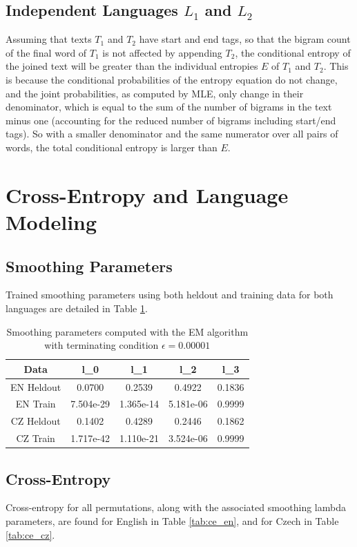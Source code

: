 \documentclass[a4paper]{article}
\begin{document}
\subsection{Independent Languages $L_1$ and $L_2$}
Assuming that texts $T_1$ and $T_2$ have start and end tags, so that the bigram
count of the final word of $T_1$ is not affected by appending $T_2$, the
conditional entropy of the joined text will be greater than the individual
entropies $E$ of $T_1$ and $T_2$. This is because the conditional probabilities
of the entropy equation do not change, and the joint probabilities, as computed
by MLE, only change in their denominator, which is equal to the sum of the
number of bigrams in the text minus one (accounting for the reduced number of
bigrams including start/end tags). So with a smaller denominator and the same
numerator over all pairs of words, the total conditional entropy is larger than
$E$.

\section{Cross-Entropy and Language Modeling}
\label{sec:lm}

\subsection{Smoothing Parameters}
Trained smoothing parameters using both heldout and training data for both
languages are detailed in Table \ref{tab:smoothing}.

\begin{table}[h]
	\centering
	\caption{Smoothing parameters computed with the EM algorithm with
		terminating condition $\epsilon=0.00001$}
	\label{tab:smoothing}
	\begin{tabular}{c|cccc}
		Data & l\_0 & l\_1 & l\_2 & l\_3 \\
		\hline
		EN Heldout & 0.0700 & 0.2539 & 0.4922 & 0.1836 \\
		EN Train & 7.504e-29 & 1.365e-14 & 5.181e-06 & 0.9999 \\
		\hline
		CZ Heldout & 0.1402& 0.4289& 0.2446 & 0.1862 \\
		CZ Train & 1.717e-42 & 1.110e-21 & 3.524e-06 & 0.9999 \\
	\end{tabular}
\end{table}

\subsection{Cross-Entropy}
Cross-entropy for all permutations, along with the associated smoothing
lambda parameters, are found for English in Table \ref{tab:ce_en}, and for Czech
in Table \ref{tab:ce_cz}. 
\end{document}
